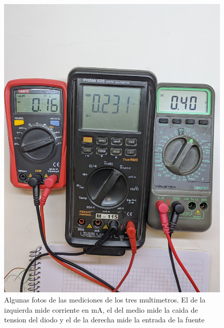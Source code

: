 \documentclass[chaptersright]{informeutn}
\begin{document}
\begin{figure}[!ht]
\begin{minipage}{0.25\textwidth}
          \includegraphics[width=1\textwidth]{pictures/mult_crkt-2_07.jpg}
        \end{minipage}
        \caption{Algunas fotos de las mediciones de los tres multimetros. El de la izquierda mide corriente en mA, el
        del medio mide la caida de tension del diodo y el de la derecha mide la entrada de la fuente}
      \end{figure}

      \begin{table}[H]
        \caption{Tabla de valores medidos del diodo de germanio.}
        \label{table.Ge}
      \end{table}
\end{document}
